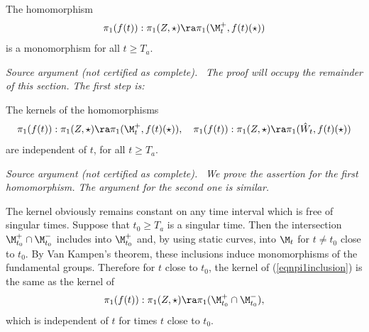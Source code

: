 \begin{proposition}
  \label{prop:kl-incompressibility-cuspidal-tori-incompressibility-cuspidal-tori-proposition}

\label{propincompressible}
The homomorphism
\begin{equation} \label{injeqn}
\pi_1(f(t)):\pi_1(Z,\star)\ra \pi_1(\M_t^+,f(t)(\star))
\end{equation}
is a monomorphism for all $t\geq T_a$.
\end{proposition}
\par\medskip\noindent\textit{Source argument (not certified as complete).}\ \begingroup\itshape
The proof will occupy the remainder of this section.
The first step is:
\begin{lemma}
  \label{lem:kl-incompressibility-cuspidal-tori-incompressibility-cuspidal-tori-lemma}
 \label{stablelemma}
The kernels of the homomorphisms
\begin{equation}
\label{eqnpi1inclusion}
\pi_1(f(t)):\pi_1(Z,\star)\ra \pi_1(\M_t^+,f(t)(\star)),\quad
\pi_1(f(t)):\pi_1(Z,\star)\ra \pi_1(\hat W_t,f(t)(\star))
\end{equation}
are independent of $t$, for all $t\geq T_a$.
\end{lemma}
\par\medskip\noindent\textit{Source argument (not certified as complete).}\ \begingroup\itshape
We prove the assertion for the first homomorphism. The argument for the
second one is similar.

The kernel obviously remains constant on any time interval which is free of
singular times. Suppose that $t_0\geq T_a$ is a singular time.  Then the intersection
$
\M_{t_0}^+\cap\M_{t_0}^-
$
includes into $\M_{t_0}^+$ and, by using static curves, into $\M_t$ for $t \neq t_0$
close to $t_0$.  By Van Kampen's theorem, these inclusions induce monomorphisms of the
fundamental groups.  Therefore for $t$ close to $t_0$,
the kernel of (\ref{eqnpi1inclusion}) is the same as the kernel of
\begin{equation}
\pi_1(f(t)):\pi_1(Z,\star)\ra \pi_1(\M_{t_0}^+\cap\M_{t_0}^-),
\end{equation}
which is independent of $t$ for times $t$ close to $t_0$.
\endgroup\par\medskip

